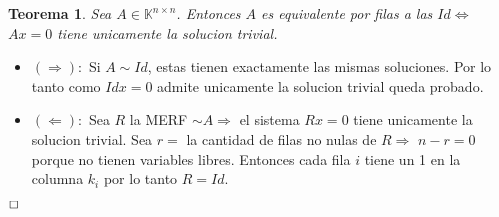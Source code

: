 \documentclass[]{article}
\newtheorem{theorem}{Teorema}
\newenvironment{proof}{\noindent{\bf Prueba:}}{$\hfill \Box$ \vspace{10pt}}
\begin{document}
\begin{theorem}
    Sea $A \in \mathbb{K}^{n \times n}$. Entonces $A$ es equivalente por filas a las $Id \iff$
    $Ax=0$ tiene unicamente la solucion trivial.
\end{theorem}
\begin{proof}
    \begin{itemize}
        \item $(\Longrightarrow):$ Si $A \sim Id$, estas tienen exactamente las mismas soluciones.
        Por lo tanto como $Idx=0$ admite unicamente la solucion trivial queda probado.
        \item $(\Longleftarrow):$ Sea $R$ la MERF $\sim A \Longrightarrow$ el sistema $Rx=0$
        tiene unicamente la solucion trivial. Sea $r=$ la cantidad de filas no nulas de $R \Longrightarrow$
        $n-r=0$ porque no tienen variables libres. Entonces cada fila $i$ tiene un 1 en la columna $k_i$
        por lo tanto $R=Id$.
    \end{itemize}
\end{proof}
\end{document}
